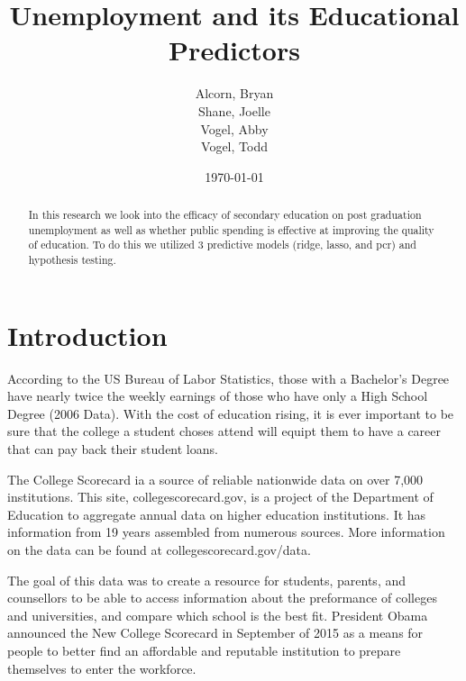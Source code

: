 \documentclass{article}\usepackage[]{graphicx}\usepackage[]{color}
\begin{document}
\title{Unemployment and its Educational Predictors}
\author{
Alcorn, Bryan\\
Shane, Joelle\\
Vogel, Abby\\
Vogel, Todd\\
}
\date{\today}

\maketitle

\begin{abstract}
In this research we look into the efficacy of secondary education on post graduation unemployment as well as whether public spending is effective at improving the quality of education.  To do this we utilized 3 predictive models (ridge, lasso, and pcr) and hypothesis testing.
\end{abstract}
\maketitle
\section{Introduction}

According to the US Bureau of Labor Statistics, those with a Bachelor's Degree have nearly twice the weekly earnings of those who have only a High School Degree (2006 Data). With the cost of education rising, it is ever important to be sure that the college a student choses attend will equipt them to have a career that can pay back their student loans. 

The College Scorecard ia a source of reliable nationwide data on over 7,000 institutions. This site, collegescorecard.gov, is a project of the Department of Education to aggregate annual data on higher education institutions. It has information from 19 years assembled from numerous sources. More information on the data can be found at collegescorecard.gov/data. 

The goal of this data was to create a resource for students, parents, and counsellors to be able to access information about the preformance of colleges and universities, and compare which school is the best fit. President Obama announced the New College Scorecard in September of 2015 as a means for people to better find an affordable and reputable institution to prepare themselves to enter the workforce. 
\end{document}
